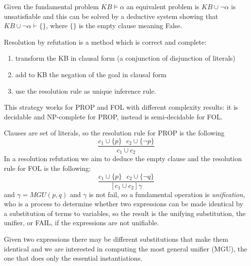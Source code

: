 Given the fundamental problem $KB \models \alpha$ an equivalent problem is
$KB \cup \neg \alpha$ is unsatisfiable and this can be solved by a deductive system
showing that $KB \cup \neg \alpha \vdash \{ \}$, where $\{ \}$ is the
empty clause meaning False.

Resolution by refutation is a method which is correct and complete:
\begin{enumerate}
   \item transform the KB in clausal form (a conjunction of disjunction of literals)
   \item add to KB the negation of the goal in clausal form
   \item use the resolution rule as unique inference rule.
\end{enumerate}
This strategy works for PROP and FOL with different complexity results:
it is decidable and NP-complete for PROP, instead is semi-decidable for FOL.

Clauses are set of literals, so the resolution rule for PROP is the following
\[ \frac{c_1 \cup \{p\} \, \, \, \, c_2 \cup \{\neg p\}} {c_1 \cup c_2} \]
In a resolution refutation we aim to deduce the empty clause and the resolution rule
for FOL is the following:
\[ \frac{c_1 \cup \{ p \} \, \, \, \, c_2 \cup \{\neg q\}} {[c_1 \cup c_2]\gamma} \]
and $\gamma = MGU(p, q)$ and $\gamma$ is not fail, so a fundamental operation is 
\emph{unification}, who is a process to determine whether two expressions can be made
identical by a substitution of terms to variables, so 
the result is the unifying substitution, the unifier, or FAIL,
if the expressions are not unifiable.

Given two expressions there may be different substitutions that make them identical and 
we are interested in computing the most general unifier (MGU), the one that does only
the essential instantiations.

